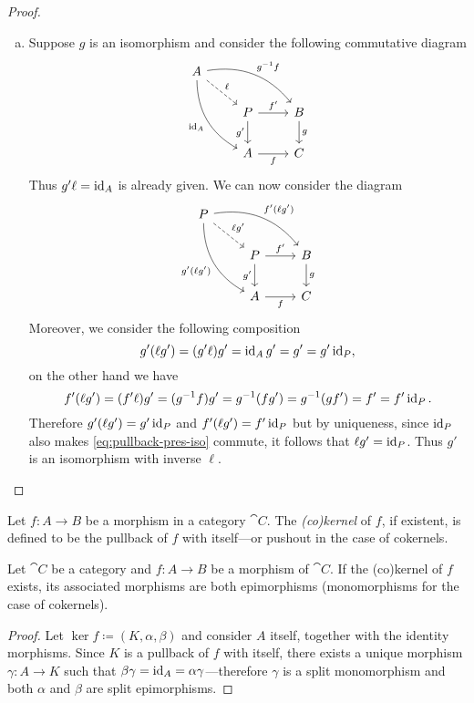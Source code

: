 \begin{proof}
\begin{enumerate}[(a)]
\item Suppose \(g\) is an isomorphism and consider the following commutative
  diagram
  \[
  \begin{tikzcd}
  A \ar[rrd, "g^{-1} f", bend left]
  \ar[drd, "\Id_{A}"', bend right]
  \ar[rd, "\ell", dashed]
  & &
  \\
  &P \ar[r, "f'"] \ar[d, "g'"']
  &B \ar[d, "g"]
  \\
  &A \ar[r, "f"'] &C
  \end{tikzcd}
  \]
  Thus \(g' \ell = \operatorname{id}_A\) is already given. We can now consider the diagram
  \begin{equation}\label{eq:pullback-pres-iso}
  \begin{tikzcd}
  P \ar[rrd, "f' (\ell g')", bend left]
  \ar[drd, "g' (\ell g')"', bend right]
  \ar[rd, "\ell g'", dashed]
  & &
  \\
  &P \ar[r, "f'"] \ar[d, "g'"']
  &B \ar[d, "g"]
  \\
  &A \ar[r, "f"'] &C
  \end{tikzcd}
  \end{equation}
  Moreover, we consider the following composition
  \[
  g' (\ell g') = (g' \ell) g' = \operatorname{id}_A g' = g' = g' \operatorname{id}_P,
  \]
  on the other hand we have
  \[
  f' (\ell g') = (f' \ell) g'
  = (g^{-1} f) g' = g^{-1} (f g')
  = g^{-1} (g f') = f' = f' \operatorname{id}_P.
  \]
  Therefore \(g' (\ell g') = g' \operatorname{id}_P\) and \(f' (\ell g') = f' \operatorname{id}_P\) but by
  uniqueness, since \(\operatorname{id}_P\) also makes \cref{eq:pullback-pres-iso} commute, it
  follows that \(\ell g' = \operatorname{id}_P\). Thus \(g'\) is an isomorphism with inverse
  \(\ell\).
\end{enumerate}
\end{proof}

\begin{definition}
\label{def:kernel-cokernel}
Let \(f: A \to B\) be a morphism in a category \(\cat C\). The \emph{(co)kernel}
of \(f\), if existent, is defined to be the pullback of \(f\) with itself---or
pushout in the case of cokernels.
\end{definition}

\begin{proposition}
\label{prop:morphisms-kernel-cokernel}
Let \(\cat C\) be a category and \(f: A \to B\) be a morphism of \(\cat C\). If
the (co)kernel of \(f\) exists, its associated morphisms are both epimorphisms
(monomorphisms for the case of cokernels).
\end{proposition}

\begin{proof}
Let \(\ker f \coloneq (K, \alpha, \beta)\) and consider \(A\) itself, together
with the identity morphisms. Since \(K\) is a pullback of \(f\) with itself,
there exists a unique morphism \(\gamma: A \to K\) such that \(\beta \gamma =
\operatorname{id}_A = \alpha \gamma\)---therefore \(\gamma\) is a split monomorphism and
both \(\alpha\) and \(\beta\) are split epimorphisms.
\end{proof}

